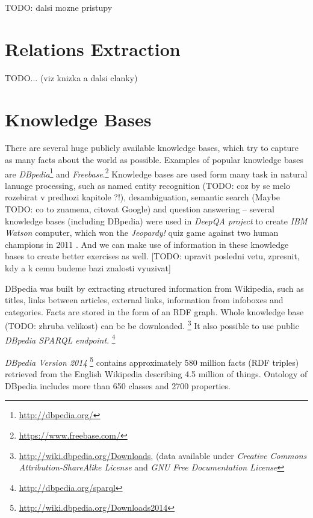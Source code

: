 \documentclass[a4paper, 12pt, twoside]{fithesis2}		%
\renewcommand{\_}{\leavevmode \kern0.0em\vbox{\hrule width0.4em}}
\begin{document}
TODO: dalsi mozne pristupy

\section{Relations Extraction}
\label{sec:relations-extraction}

TODO... (viz knizka a dalsi clanky)

\section{Knowledge Bases}
\label{sec:knowledge-bases}

There are several huge publicly available knowledge bases,
which try to capture as many facts about the world as possible.
Examples of popular knowledge bases are
\textit{DBpedia}\footnote{\url{http://dbpedia.org/}}
and \textit{Freebase}.\footnote{\url{https://www.freebase.com/}}
Knowledge bases are used form many task in natural lanuage processing,
such as named entity recognition (TODO: coz by se melo rozebirat v predhozi kapitole ?!),
desambiguation,
semantic search (Maybe TODO: co to znamena, citovat Google)
and question answering -- several knowledge bases (including DBpedia) were used in \emph{DeepQA project} to create \emph{IBM Watson} computer, which won the \emph{Jeopardy!} quiz game against two human champions in 2011 \cite{watson}. And we can make use of information in these knowledge bases to create better exercises as well. [TODO: upravit posledni vetu, zpresnit, kdy a k cemu budeme bazi znalosti vyuzivat]

DBpedia was built by extracting structured information from Wikipedia,
such as titles, links between articles, external links, information from infoboxes and categories.
Facts are stored in the form of an RDF graph.
Whole knowledge base (TODO: zhruba velikost) can be be downloaded.%
\footnote{\url{http://wiki.dbpedia.org/Downloads}, %
(data available under \emph{Creative Commons Attribution-ShareAlike License}
and \emph{GNU Free Documentation License}}
It also possible to use public \textit{DBpedia SPARQL endpoint}.%
\footnote{\url{http://dbpedia.org/sparql}}

\emph{DBpedia Version 2014}%
\footnote{\url{http://wiki.dbpedia.org/Downloads2014}}
contains approximately 580 million facts (RDF triples) retrieved from the English Wikipedia
\parencite{dbpedia} describing 4.5 million of things.
Ontology of DBpedia includes more than 650 classes and 2700 properties.
\end{document}
